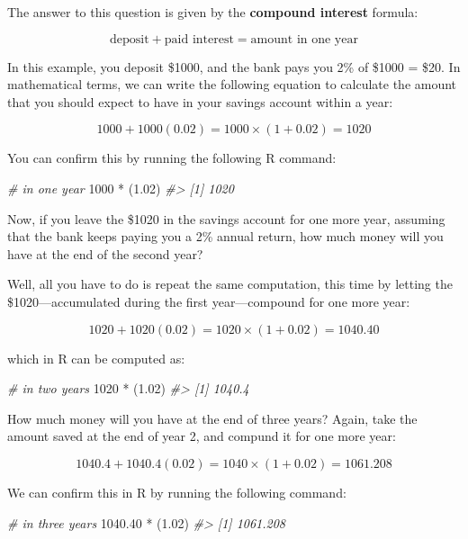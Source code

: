 \documentclass[
]{book}
\newenvironment{Shaded}{\begin{snugshade}}{\end{snugshade}}
\newcommand{\CommentTok}[1]{\textcolor[rgb]{0.56,0.35,0.01}{\textit{#1}}}
\newcommand{\DecValTok}[1]{\textcolor[rgb]{0.00,0.00,0.81}{#1}}
\newcommand{\FloatTok}[1]{\textcolor[rgb]{0.00,0.00,0.81}{#1}}
\newcommand{\NormalTok}[1]{#1}
\newcommand{\SpecialCharTok}[1]{\textcolor[rgb]{0.00,0.00,0.00}{#1}}
\begin{document}
The answer to this question is given by the \textbf{compound interest} formula:

\[
\text{deposit} + \text{paid interest} = \text{amount in one year}
\]

In this example, you deposit \$1000, and the bank pays you 2\% of \$1000 = \$20.
In mathematical terms, we can write the following equation to calculate the
amount that you should expect to have in your savings account within a year:

\[
1000 + 1000 (0.02) = 1000 \times (1 + 0.02) = 1020
\]

You can confirm this by running the following R command:

\begin{Shaded}
\begin{Highlighting}[]
\CommentTok{\# in one year}
\DecValTok{1000} \SpecialCharTok{*}\NormalTok{ (}\FloatTok{1.02}\NormalTok{)}
\CommentTok{\#\textgreater{} [1] 1020}
\end{Highlighting}
\end{Shaded}

Now, if you leave the \$1020 in the savings account for one more year, assuming
that the bank keeps paying you a 2\% annual return, how much money will you have
at the end of the second year?

Well, all you have to do is repeat the same computation, this time by letting
the \$1020---accumulated during the first year---compound for one more year:

\[
1020 + 1020 (0.02) = 1020 \times (1 + 0.02) = 1040.40
\]

which in R can be computed as:

\begin{Shaded}
\begin{Highlighting}[]
\CommentTok{\# in two years}
\DecValTok{1020} \SpecialCharTok{*}\NormalTok{ (}\FloatTok{1.02}\NormalTok{)}
\CommentTok{\#\textgreater{} [1] 1040.4}
\end{Highlighting}
\end{Shaded}

How much money will you have at the end of three years? Again, take the amount
saved at the end of year 2, and compund it for one more year:

\[
1040.4 + 1040.4 (0.02) = 1040 \times (1 + 0.02) = 1061.208
\]

We can confirm this in R by running the following command:

\begin{Shaded}
\begin{Highlighting}[]
\CommentTok{\# in three years}
\FloatTok{1040.40} \SpecialCharTok{*}\NormalTok{ (}\FloatTok{1.02}\NormalTok{)}
\CommentTok{\#\textgreater{} [1] 1061.208}
\end{Highlighting}
\end{Shaded}
\end{document}
